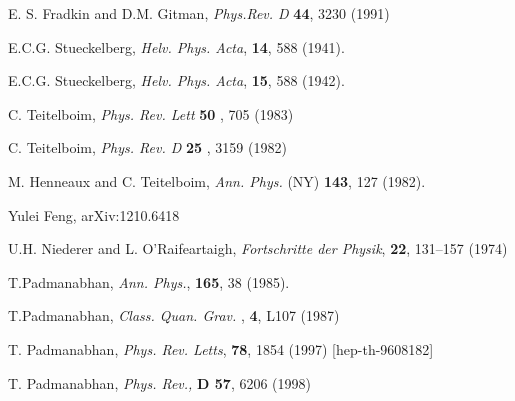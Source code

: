 \documentclass{article}
\begin{document}
\begin{thebibliography}{000}
  E. S. Fradkin and D.M. Gitman,  \textit{Phys.Rev. D} \textbf{44},  3230 (1991)
  
  E.C.G. Stueckelberg, \textit{ Helv. Phys. Acta}, \textbf{14}, 588 (1941).
 
  E.C.G. Stueckelberg, \textit{ Helv. Phys. Acta}, \textbf{15}, 588 (1942).

   C. Teitelboim, \textit{Phys. Rev. Lett} \textbf{50} , 705 (1983)
 
   C. Teitelboim, \textit{Phys. Rev. D} \textbf{25} , 3159 (1982)
 
   M. Henneaux and C. Teitelboim, \textit{Ann. Phys.} (NY) \textbf{143}, 127 (1982). 

  Yulei Feng, arXiv:1210.6418
  
 U.H. Niederer and L. O’Raifeartaigh,  \textit{Fortschritte der Physik}, \textbf{22}, 131–157 (1974)

  
T.Padmanabhan,  \textit{Ann. Phys.},  \textbf{165}, 38 (1985). 


T.Padmanabhan, \textit{Class. Quan. Grav. }, \textbf{4}, L107 (1987)


T. Padmanabhan, \textit{Phys. Rev. Letts}, \textbf{78}, 1854 (1997) [hep-th-9608182] 


T. Padmanabhan, \textit{ Phys. Rev.,} \textbf{D 57}, 6206 (1998) 

\end{thebibliography}
\end{document}
